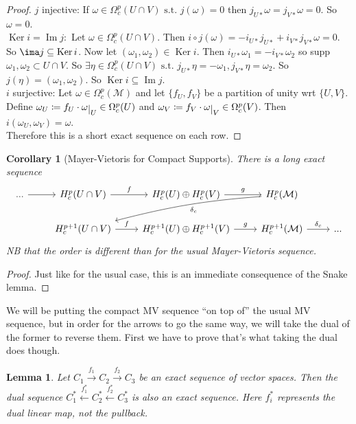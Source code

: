 \documentclass[10pt]{article}
\theoremstyle{plain}
\newtheorem{corollary}[thm]{Corollary}
\newtheorem{lemma}[thm]{Lemma}
\theoremstyle{definition}
\newcommand{\st}{\text{ s.t. }}
\newcommand{\man}{\mathcal{M}}
\def\restrict#1{\raise-.5ex\hbox{\ensuremath|}_{#1}}
\DeclareMathOperator{\Ker}{Ker}
\DeclareMathOperator{\Ima}{Im}
\newcommand{\UintV}{U\cap V}
\begin{document}
\begin{proof}
$j$ injective: If $\omega \in \Omega^p_c(U\cap V) \st j(\omega) = 0 $ then $ j_{U*} \omega = j_{V*} \omega= 0 $. So $\omega = 0$.\\
$\Ker i = \Ima j:$ Let $\omega \in \Omega^p_c(U\cap V)$. Then $i \circ j (\omega) = - i_{U*} j_{U*} + i_{V*} j_{V*} \omega = 0$. So $\ima j \subseteq \Ker i$. Now let $(\omega_1,\omega_2) \in \Ker i$. Then $i_{U*} \omega_1 = -i_{V*} \omega_2$ so supp $\omega_1,\omega_2 \subset U\cap V$. So $\exists \eta \in \Omega_c^p(U\cap V) \st j_{U*}\eta = -\omega_1, j_{V*} \eta = \omega_2$. So $j(\eta) = (\omega_1,\omega_2).$ So $\Ker i \subseteq \Ima j$. \\
$i$ surjective: Let $\omega \in \Omega_c^p(\man)$ and let $\{f_U,f_V\}$ be a partition of unity wrt $\{U,V\}$. Define $\omega_U \coloneqq f_U \cdot \omega\restrict{U} \in \Omega_c^p(U)$ and $\omega_V \coloneqq f_V \cdot \omega\restrict{V} \in \Omega_c^p(V)$. Then $i(\omega_U,\omega_V) = \omega$.\\
Therefore this is a short exact sequence on each row.
\end{proof}
\begin{corollary}[Mayer-Vietoris for Compact Supports]\label{cor:CompactMVT}
There is a long exact sequence
$$\begin{tikzcd}
... \arrow[r] & H_c^p(\UintV) \arrow[r, "f"]     & H_c^p(U)\oplus H_c^p(V) \arrow[r, "g"]         & H_c^p(\mathcal{M}) \arrow[lld, "\delta_c",bend right = 5] &     \\
              & H_c^{p+1}(\UintV) \arrow[r, "f"] & H_c^{p+1}(U)\oplus H_c^{p+1}(V) \arrow[r, "g"] & H_c^{p+1}(\mathcal{M}) \arrow[r, "\delta_c"]                          & ...
\end{tikzcd}$$
NB that the order is different than for the usual Mayer-Vietoris sequence.
\end{corollary}
\begin{proof}
Just like for the usual case, this is an immediate consequence of the Snake lemma.
\end{proof}
We will be putting the compact MV sequence ``on top of'' the usual MV sequence, but in order for the arrows to go the same way, we will take the dual of the former to reverse them. First we have to prove that's what taking the dual does though.
\begin{lemma}
Let $C_1 \xrightarrow{f_1} C_2 \xrightarrow{f_2} C_3$ be an exact sequence of vector spaces. Then the dual sequence $C_1^* \xleftarrow[]{f_1^*} C_2^* \xleftarrow[]{f_2^*} C_3^*$ is also an exact sequence. Here $f_i^*$ represents the dual linear map, not the pullback.
\end{lemma}
\end{document}
